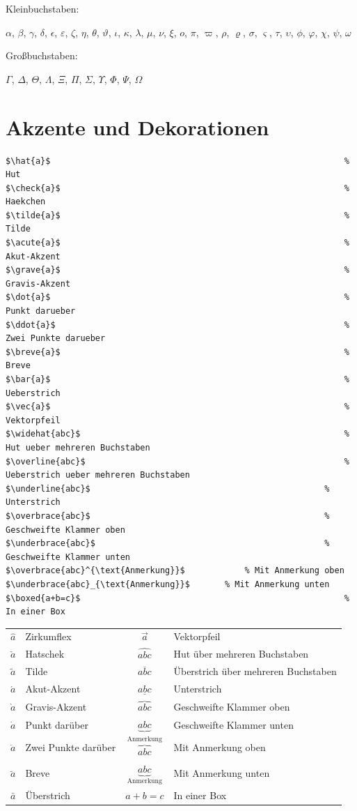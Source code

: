 \documentclass[12pt,a4paper]{article}
\begin{document}
\begin{ausgabe}
Kleinbuchstaben:

$\alpha$, $\beta$, $\gamma$, $\delta$, $\epsilon$, $\varepsilon$, 
$\zeta$, $\eta$, $\theta$, $\vartheta$, $\iota$, $\kappa$, 
$\lambda$, $\mu$, $\nu$, $\xi$, $o$, $\pi$, $\varpi$, 
$\rho$, $\varrho$, $\sigma$, $\varsigma$, $\tau$, $\upsilon$, 
$\phi$, $\varphi$, $\chi$, $\psi$, $\omega$

Großbuchstaben:

$\Gamma$, $\Delta$, $\Theta$, $\Lambda$, $\Xi$, $\Pi$, 
$\Sigma$, $\Upsilon$, $\Phi$, $\Psi$, $\Omega$
\end{ausgabe}

\section{Akzente und Dekorationen}

\begin{lstlisting}[style=latex]
$\hat{a}$        													% Hut
$\check{a}$      													% Haekchen
$\tilde{a}$      													% Tilde
$\acute{a}$      													% Akut-Akzent
$\grave{a}$      													% Gravis-Akzent
$\dot{a}$        													% Punkt darueber
$\ddot{a}$      					 								% Zwei Punkte darueber
$\breve{a}$      													% Breve
$\bar{a}$        													% Ueberstrich
$\vec{a}$        													% Vektorpfeil
$\widehat{abc}$  													% Hut ueber mehreren Buchstaben
$\overline{abc}$ 													% Ueberstrich ueber mehreren Buchstaben
$\underline{abc}$ 												% Unterstrich
$\overbrace{abc}$ 												% Geschweifte Klammer oben
$\underbrace{abc}$ 												% Geschweifte Klammer unten
$\overbrace{abc}^{\text{Anmerkung}}$ 			% Mit Anmerkung oben
$\underbrace{abc}_{\text{Anmerkung}}$ 		% Mit Anmerkung unten
$\boxed{a+b=c}$  													% In einer Box
\end{lstlisting}

\begin{ausgabe}
\begin{tabular}{l l c l}
	$\hat{a}$ & Zirkumflex & $\vec{a}$ & Vektorpfeil\\
	$\check{a}$ & Hatschek & $\widehat{abc}$ & Hut über mehreren Buchstaben\\
	$\tilde{a}$ & Tilde & $\overline{abc}$ & Überstrich über mehreren Buchstaben\\
	$\acute{a}$ & Akut-Akzent & $\underline{abc}$ & Unterstrich\\
	$\grave{a}$ & Gravis-Akzent & $\overbrace{abc}$ & Geschweifte Klammer oben\\
	$\dot{a}$ & Punkt darüber & $\underbrace{abc}$ & Geschweifte Klammer unten\\
	$\ddot{a}$ & Zwei Punkte darüber & $\overbrace{abc}^{\text{Anmerkung}}$ & Mit Anmerkung oben\\
	$\breve{a}$ & Breve & $\underbrace{abc}_{\text{Anmerkung}}$ & Mit Anmerkung unten\\
	$\bar{a}$ & Überstrich & $\boxed{a+b=c}$ & In einer Box
\end{tabular}
\end{ausgabe}
\end{document}
